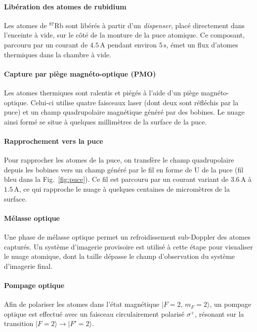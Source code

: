 \paragraph{Libération des atomes de rubidium}
Les atomes de $^{87}$Rb sont libérés à partir d’un \emph{dispenser}, placé directement dans l’enceinte à vide, sur le côté de la monture de la puce atomique. Ce composant, parcouru par un courant de \( 4.5\,\mathrm{A} \) pendant environ \( 5\,\mathrm{s} \), émet un flux d’atomes thermiques dans la chambre à vide.

\paragraph{Capture par piège magnéto-optique (PMO)}
Les atomes thermiques sont ralentis et piégés à l’aide d’un piège magnéto-optique. Celui-ci utilise quatre faisceaux laser (dont deux sont réfléchis par la puce) et un champ quadrupolaire magnétique généré par des bobines. Le nuage ainsi formé se situe à quelques millimètres de la surface de la puce.

\paragraph{Rapprochement vers la puce}
Pour rapprocher les atomes de la puce, on transfère le champ quadrupolaire depuis les bobines vers un champ généré par le fil en forme de U de la puce (fil bleu dans la Fig.~\ref{fig:puce}). Ce fil est parcouru par un courant variant de \( 3.6\,\mathrm{A} \) à \( 1.5\,\mathrm{A} \), ce qui rapproche le nuage à quelques centaines de micromètres de la surface.

\paragraph{Mélasse optique}
Une phase de mélasse optique permet un refroidissement sub-Doppler des atomes capturés. Un système d’imagerie provisoire est utilisé à cette étape pour visualiser le nuage atomique, dont la taille dépasse le champ d’observation du système d’imagerie final.

\paragraph{Pompage optique}
Afin de polariser les atomes dans l’état magnétique \( |F=2,\,m_F=2\rangle \), un pompage optique est effectué avec un faisceau circulairement polarisé \( \sigma^+ \), résonant sur la transition \( |F=2\rangle \rightarrow |F'=2\rangle \).


